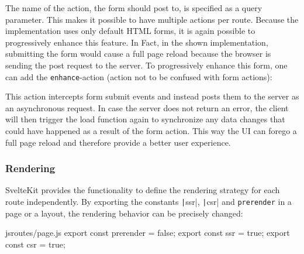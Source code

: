 The name of the action, the form should post to, is specified as a query parameter. This makes it possible to have multiple actions per route. Because the implementation uses only default HTML forms, it is again possible to progressively enhance this feature. In Fact, in the shown implementation, submitting the form would cause a full page reload because the browser is sending the post request to the server. To progressively enhance this form, one can add the \texttt{enhance}-action (action  not to be confused with form actions):

\s{$}

This action intercepts form submit events and instead posts them to the server as an asynchronous request. In case the server does not return an error, the client will then trigger the load function again to synchronize any data changes that could have happened as a result of the form action. This way the UI can forego a full page reload and therefore provide a better user experience.

\subsubsection{Rendering}

SvelteKit provides the functionality to define the rendering strategy for each route independently. By exporting the constants \texttt|ssr|, \texttt|csr| and \texttt{prerender} in a page or a layout, the rendering behavior can be precisely changed:
\begin{myminted}{js}{routes/page.js}
export const prerender = false;
export const ssr = true;
export const csr = true;
\end{myminted}

